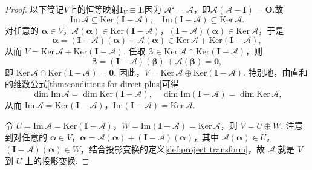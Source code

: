 \documentclass[12pt, a4paper,newtx]{ctexart}
\begin{document}
\begin{proof}
	以下简记$V$上的恒等映射$\bm I_V\equiv \bm I.$因为 $\mathcal{A}^2 = \mathcal{A}$，即$\mathcal{A}(\mathcal A-\bm I)=\bm O.$故\begin{equation}
		\text{Im}\,\mathcal{A} \subseteq \text{Ker}(\bm{I} - \mathcal{A}),\quad \text{Im}(\bm{I} - \mathcal{A}) \subseteq \text{Ker}\,\mathcal{A}. 
	\end{equation}对任意的 $\bm{\alpha} \in V$，$\mathcal{A}(\bm{\alpha}) \in \text{Ker}(\bm{I} - \mathcal{A})$，$(\bm{I} - \mathcal{A})(\bm{\alpha}) \in \text{Ker}\,\mathcal{A}$，于是 \[\bm{\alpha} = (\bm{I} - \mathcal{A})(\bm{\alpha}) + \mathcal{A}(\bm{\alpha}) \in \text{Ker}\,\mathcal{A} + \text{Ker}(\bm{I} - \mathcal{A}),\]从而 $V = \text{Ker}\,\mathcal{A} + \text{Ker}(\bm{I} - \mathcal{A})$. 任取 $\bm{\beta} \in \text{Ker}\,\mathcal{A} \cap \text{Ker}(\bm{I} - \mathcal{A})$，则 \[\bm{\beta} = (\bm{I} - \mathcal{A})(\bm{\beta}) + \mathcal{A}(\bm{\beta}) = \bm{0},\]即 $\text{Ker}\,\mathcal{A} \cap \text{Ker}(\bm{I} - \mathcal{A}) = \bm{0}$. 因此，$V = \text{Ker}\,\mathcal{A} \oplus \text{Ker}(\bm{I} - \mathcal{A})$. 特别地，由直和的维数公式\ref{thm:conditions for direct plus}可得 \[\dim \text{Im}\,\mathcal{A} = \dim \text{Ker}(\bm{I} - \mathcal{A}),\quad\dim \text{Im}(\bm{I} - \mathcal{A}) = \dim \text{Ker}\,\mathcal{A},\]从而 $\text{Im}\,\mathcal{A} = \text{Ker}(\bm{I} - \mathcal{A})$，$\text{Im}(\bm{I} - \mathcal{A}) = \text{Ker}\,\mathcal{A}$. 
	
	令 $U = \text{Im}\,\mathcal{A} = \text{Ker}(\bm{I} - \mathcal{A})$，$W = \text{Im}(\bm{I} - \mathcal{A}) = \text{Ker}\,\mathcal{A}$，则 $V = U \oplus W$. 注意到对任意的 $\bm{\alpha} \in V$，$\bm{\alpha} = \mathcal{A}(\bm{\alpha}) + (\bm{I} - \mathcal{A})(\bm{\alpha})$，其中 $\mathcal{A}(\bm{\alpha}) \in U$，$(\bm{I} - \mathcal{A})(\bm{\alpha}) \in W$，结合投影变换的定义\ref{def:project transform}，故 $\mathcal{A}$ 就是 $V$ 到 $U$ 上的投影变换. 
\end{proof}
\end{document}
